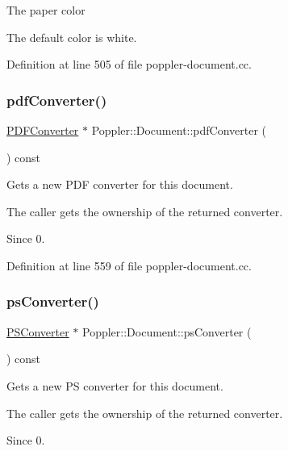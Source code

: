 The paper color

The default color is white. 

Definition at line 505 of file poppler-\/document.\+cc.

\mbox{\label{class_poppler_1_1_document_a1ba7a683fae5246efacedb7d82e4b997}} 
\subsubsection{\texorpdfstring{pdf\+Converter()}{pdfConverter()}}
{\footnotesize\ttfamily \hyperlink{class_poppler_1_1_p_d_f_converter}{P\+D\+F\+Converter} $\ast$ Poppler\+::\+Document\+::pdf\+Converter (\begin{DoxyParamCaption}{ }\end{DoxyParamCaption}) const}

Gets a new P\+DF converter for this document.

The caller gets the ownership of the returned converter.

\begin{DoxySince}{Since}
0. 
\end{DoxySince}


Definition at line 559 of file poppler-\/document.\+cc.

\mbox{\label{class_poppler_1_1_document_ab8c34ac2172d450753660bc7c31c82d7}} 
\subsubsection{\texorpdfstring{ps\+Converter()}{psConverter()}}
{\footnotesize\ttfamily \hyperlink{class_poppler_1_1_p_s_converter}{P\+S\+Converter} $\ast$ Poppler\+::\+Document\+::ps\+Converter (\begin{DoxyParamCaption}{ }\end{DoxyParamCaption}) const}

Gets a new PS converter for this document.

The caller gets the ownership of the returned converter.

\begin{DoxySince}{Since}
0. 
\end{DoxySince}


